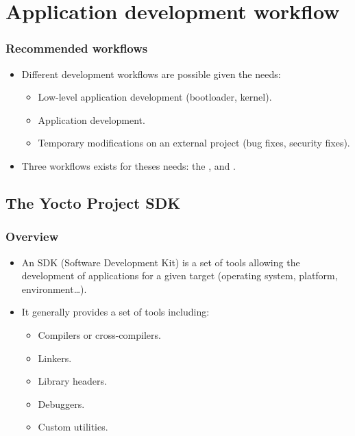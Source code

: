 \section{Application development workflow}

\begin{frame}
  \frametitle{Recommended workflows}
  \begin{itemize}
    \item Different development workflows are possible given the
      needs:
      \begin{itemize}
        \item Low-level application development (bootloader, kernel).
        \item Application development.
        \item Temporary modifications on an external project (bug
          fixes, security fixes).
      \end{itemize}
    \item Three workflows exists for theses needs: the ,
       and .
  \end{itemize}
\end{frame}

\subsection{The Yocto Project SDK}

\begin{frame}
  \frametitle{Overview}
  \begin{itemize}
    \item An SDK (Software Development Kit) is a set of tools allowing
      the development of applications for a given target (operating
      system, platform, environment\dots).
    \item It generally provides a set of tools including:
      \begin{itemize}
        \item Compilers or cross-compilers.
        \item Linkers.
        \item Library headers.
        \item Debuggers.
        \item Custom utilities.
      \end{itemize}
  \end{itemize}
\end{frame}

